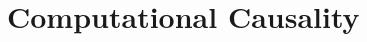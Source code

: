 \documentclass[11pt,a4paper]{book}
\theoremstyle{definition}
\theoremstyle{definition}
\newtheorem{example}{Example}[section]
\theoremstyle{definition}
\theoremstyle{remark}
\begin{document}
\chapter{Computational Causality}
\label{ch:comp_causality}


















%
%
%
\end{document}
